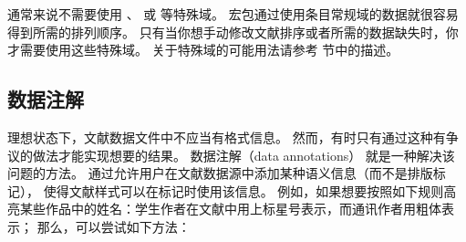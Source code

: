 
通常来说不需要使用 、 或  等特殊域。
\biblatex 宏包通过使用条目常规域的数据就很容易得到所需的排列顺序。
只有当你想手动修改文献排序或者所需的数据缺失时，你才需要使用这些特殊域。
关于特殊域的可能用法请参考  节中的描述。


\subsection{数据注解}%
\label{use:annote}
理想状态下，文献数据文件中不应当有格式信息。
然而，有时只有通过这种有争议的做法才能实现想要的结果。
数据注解（data annotations） 就是一种解决该问题的方法。
通过允许用户在文献数据源中添加某种语义信息（而不是排版标记），
使得文献样式可以在标记时使用该信息。
例如，如果想要按照如下规则高亮某些作品中的姓名：学生作者在文献中用上标星号表示，而通讯作者用粗体表示；
那么，可以尝试如下方法：

